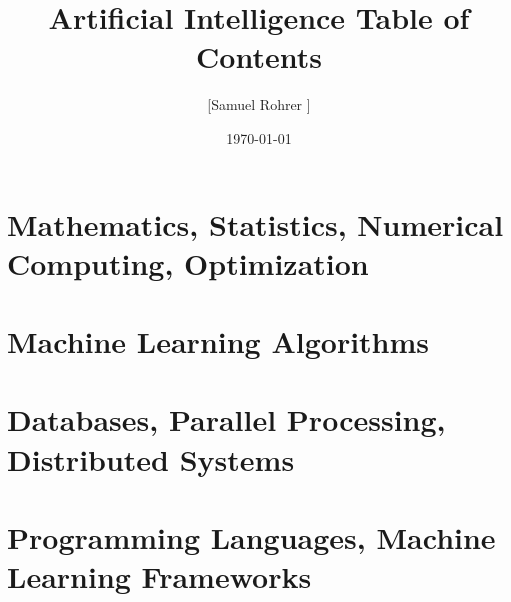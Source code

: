 \documentclass[12pt, oneside]{article}
\title{Artificial Intelligence Table of Contents}
\author{[Samuel Rohrer \textcopyright]}
\date{\today}
\begin{document}
\maketitle
\tableofcontents

\newpage
\section{Mathematics, Statistics, Numerical Computing, Optimization}


\newpage
\section{Machine Learning Algorithms}


\newpage
\section{Databases, Parallel Processing, Distributed Systems}


\newpage
\section{Programming Languages, Machine Learning Frameworks}

\end{document}
